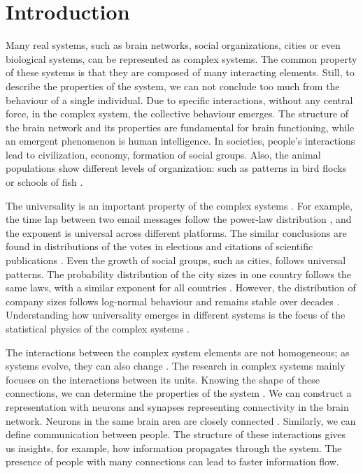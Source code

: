 \chapter{Introduction} %

Many real systems, such as brain networks, social organizations, cities or even biological systems, can be represented as complex systems. The common property of these systems is that they are composed of many interacting elements. Still, to describe the properties of the system, we can not conclude too much from the behaviour of a single individual. Due to specific interactions, without any central force, in the complex system, the collective behaviour \cite{kwapien2012} emerges. The structure of the brain network and its properties are fundamental for brain functioning, while an emergent phenomenon is human intelligence. In societies, people's interactions lead to civilization, economy, formation of social groups. Also, the animal populations show different levels of organization: such as patterns in bird flocks or schools of fish \cite{thurner2018}.

The universality is an important property of the complex systems  \cite{binney1992}. For example, the time lap between two email messages follow the power-law distribution \cite{garas2012emotional}, and the exponent is universal across different platforms. The similar conclusions are found in distributions of the votes in elections \cite{fortunato2007scaling, chatterjee2013} and citations of scientific publications \cite{radicchi2008}. Even the growth of social groups, such as cities, follows universal patterns. The probability distribution of the city sizes in one country follows the same laws, with a similar exponent for all countries \cite{barthelemy2019, fazio2015pareto}. However, the distribution of company sizes follows log-normal behaviour and remains stable over decades \cite{amaral1997scaling, stanley1996scaling}. Understanding how universality emerges in different systems is the focus of the statistical physics of the complex systems \cite{verbavatz2020}. 

The interactions between the complex system elements are not homogeneous; as systems evolve, they can also change \cite{thurner2018}. The research in complex systems mainly focuses on the interactions between its units. Knowing the shape of these connections, we can determine the properties of the system \cite{ladyman2013}. We can construct a representation with neurons and synapses representing connectivity in the brain network. Neurons in the same brain area are closely connected \cite{latora2017complex}.
Similarly, we can define communication between people. The structure of these interactions gives us insights, for example, how information propagates through the system. The presence of people with many connections can lead to faster information flow. 

